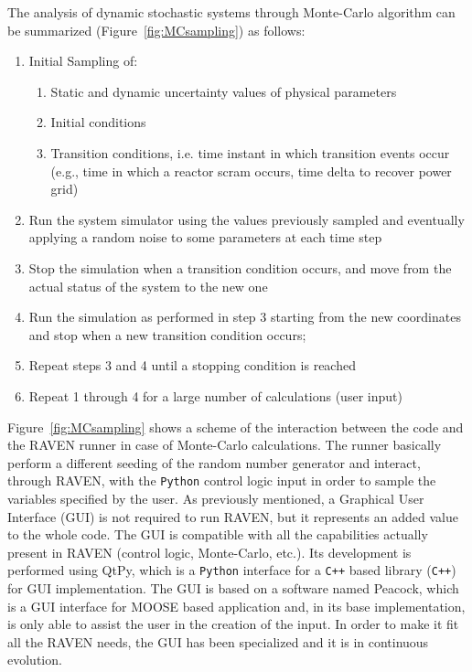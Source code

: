 \documentclass{mc2013}
\begin{document}
The analysis of dynamic stochastic systems through Monte-Carlo algorithm can be summarized (Figure~\ref{fig:MCsampling}) as follows:
\begin{enumerate}
\item Initial Sampling of:
       \begin{enumerate}
       \item Static and dynamic uncertainty values of physical parameters
       \item Initial conditions
       \item Transition conditions, i.e. time instant in which transition events occur (e.g., time in which a reactor scram occurs, time delta to recover power grid)
    \end{enumerate}
\item Run the system simulator using the values previously sampled and eventually applying a random noise to some parameters at each time step
\item Stop the simulation when a transition condition occurs, and move from the actual status of the system   to the new one
\item Run the simulation as performed in step 3 starting from the new coordinates and stop when a new transition condition occurs;
\item Repeat steps 3 and 4 until a stopping condition is reached
\item Repeat 1 through 4 for a large number of calculations (user input)
\end{enumerate}
Figure~\ref{fig:MCsampling} shows a scheme of the interaction between the code and the RAVEN runner in case of Monte-Carlo calculations. The runner basically perform a different seeding of the random number generator and interact, through RAVEN, with the \verb!Python! control logic input in order to sample the variables specified by the user.
\label{sec:GUI}
As previously mentioned, a Graphical User Interface (GUI) is not required to run RAVEN, but it represents an added value to the whole code. The GUI is compatible with all the capabilities actually present in RAVEN (control logic, Monte-Carlo, etc.).  Its development is performed using QtPy, which is a \verb!Python! interface for a \verb!C++! based library (\verb!C++!) for GUI implementation. The GUI is based on a software named Peacock, which is a GUI interface for MOOSE based application and, in its base implementation, is only able to assist the user in the creation of the input.  In order to make it fit all the RAVEN needs, the GUI has been specialized and it is in continuous evolution. 
\end{document}
